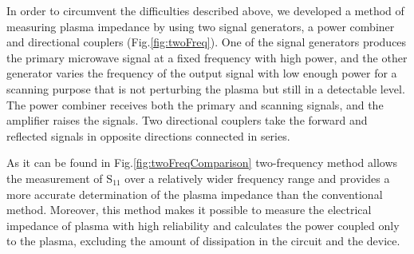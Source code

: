 In order to circumvent the difficulties described above, we developed a method of measuring plasma impedance by using two signal generators, a power combiner and directional couplers (Fig.\ref{fig:twoFreq}). One of the signal generators produces the primary microwave signal at a fixed frequency with high power, and the other generator varies the frequency of the output signal with low enough power for a scanning purpose that is not perturbing the plasma but still in a detectable level. The power combiner receives both the primary and scanning signals, and the amplifier raises the signals. Two directional couplers take the forward and reflected signals in opposite directions connected in series.

As it can be found in Fig.\ref{fig:twoFreqComparison} two-frequency method allows the measurement of $\text{S}_{11}$ over a relatively wider frequency range and provides a more accurate determination of the plasma impedance than the conventional method. Moreover, this method makes it possible to measure the electrical impedance of plasma with high reliability and calculates the power coupled only to the plasma, excluding the amount of dissipation in the circuit and the device.

